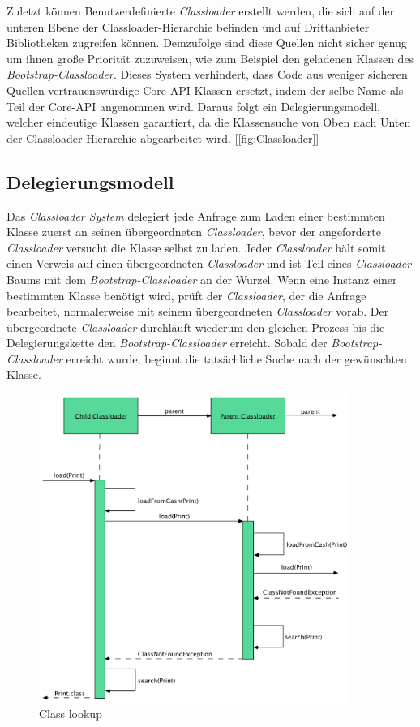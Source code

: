     Zuletzt können Benutzerdefinierte \textit{Classloader} erstellt werden, die sich auf der unteren Ebene der Classloader-Hierarchie befinden und auf Drittanbieter Bibliotheken zugreifen können. 
    Demzufolge sind diese Quellen nicht sicher genug um ihnen große Priorität zuzuweisen, wie zum Beispiel den geladenen Klassen des \textit{Bootstrap-Classloader}. 
    \bigbreak Dieses System verhindert, dass Code aus weniger sicheren Quellen vertrauenswürdige Core-API-Klassen ersetzt, indem der selbe Name als Teil der Core-API angenommen wird. 
    Daraus folgt ein Delegierungsmodell, welcher eindeutige Klassen garantiert, da die Klassensuche von Oben nach Unten der Classloader-Hierarchie abgearbeitet wird. [\ref{fig:Classloader}] 
    
  \subsection{Delegierungsmodell}
    Das \textit{Classloader System} delegiert jede Anfrage zum Laden einer bestimmten Klasse zuerst an seinen übergeordneten \textit{Classloader}, bevor der angeforderte \textit{Classloader} versucht die Klasse selbst zu laden. 
    Jeder \textit{Classloader} hält somit einen Verweis auf einen übergeordneten \textit{Classloader} und ist Teil eines \textit{Classloader} Baums mit dem \textit{Bootstrap-Classloader} an der Wurzel. Wenn eine Instanz einer bestimmten Klasse benötigt wird, prüft der \textit{Classloader}, der die Anfrage bearbeitet, normalerweise mit seinem übergeordneten \textit{Classloader} vorab. Der übergeordnete \textit{Classloader} durchläuft wiederum den gleichen Prozess bis die Delegierungskette den \textit{Bootstrap-Classloader} erreicht. Sobald der \textit{Bootstrap-Classloader} erreicht wurde, beginnt die tatsächliche Suche nach der gewünschten Klasse.
    \begin{figure}[h]
      \centering
      \includegraphics[width=0.9\textwidth]{material/images/deligation.png}
      \caption{Class lookup}
      \label{fig:deligation}
    \end{figure}
